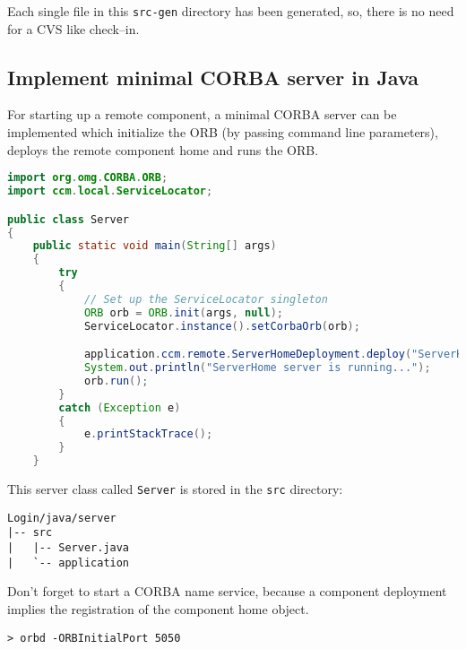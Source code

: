 Each single file in this {\tt src-gen} directory has been generated, so, 
there is no need for a CVS like check--in.


\subsection{Implement minimal CORBA server in Java}
\label{subsection:ImplementMinimalCorbaServerJava}
For starting up a remote component, a minimal CORBA server can be implemented 
which initialize the ORB (by passing command line parameters), deploys the remote
component home and runs the ORB.

\begin{footnotesize}
\begin{lstlisting}[language=Java]
import org.omg.CORBA.ORB;
import ccm.local.ServiceLocator;

public class Server
{
    public static void main(String[] args)
    {
        try
        {
            // Set up the ServiceLocator singleton
            ORB orb = ORB.init(args, null);
            ServiceLocator.instance().setCorbaOrb(orb);

            application.ccm.remote.ServerHomeDeployment.deploy("ServerHome");
            System.out.println("ServerHome server is running...");
            orb.run();
        }
        catch (Exception e)
        {
            e.printStackTrace();
        }
    }
\end{lstlisting}
\end{footnotesize}

This server class called {\tt Server} is stored in the {\tt src} directory:
\begin{footnotesize}
\begin{verbatim}
Login/java/server
|-- src
|   |-- Server.java
|   `-- application
\end{verbatim}
\end{footnotesize}

Don't forget to start a CORBA name service, because a component deployment
implies the registration of the component home object.
\begin{footnotesize}
\begin{verbatim}
> orbd -ORBInitialPort 5050
\end{verbatim}
\end{footnotesize}

